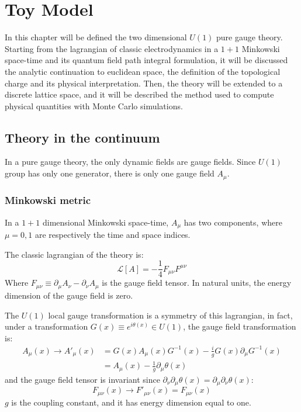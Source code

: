 \chapter{Toy Model}\label{ch:toy_model}

In this chapter will be defined the two dimensional $U(1)$ pure gauge theory.
Starting from the lagrangian of classic electrodynamics in a $1+1$ Minkowski space-time and its quantum field path integral formulation,
it will be discussed the analytic continuation to euclidean space, the definition of the topological charge and its physical interpretation.
Then, the theory will be extended to a discrete lattice space, and it will be described the method used to compute physical quantities with Monte Carlo simulations.

\section{Theory in the continuum}

In a pure gauge theory, the only dynamic fields are gauge fields.
Since $U(1)$ group has only one generator, there is only one gauge field $A_\mu$.

\subsection*{Minkowski metric}

In a $1+1$ dimensional Minkowski space-time, $A_\mu$ has two components, where $\mu = 0, 1$ are respectively the time and space indices.

The classic lagrangian of the theory is:
\[
    \mathcal L[A] = -\frac{1}{4} F_{\mu\nu}F^{\mu\nu}
\]
Where $F_{\mu\nu} \equiv \partial_\mu A_\nu - \partial_\nu A_\mu$ is the gauge field tensor.
In natural units, the energy dimension of the gauge field is zero.

The $U(1)$ local gauge transformation is a symmetry of this lagrangian, in fact,
under a transformation $G(x) \equiv e^{i\theta(x)} \in U(1)$,
the gauge field transformation is:
\begin{align*}
    A_\mu(x) \rightarrow A'_\mu(x) &= G(x) A_\mu(x) G^{-1}(x) - \frac{i}{g} G(x) \partial_\mu G^{-1}(x) \\
                                   &= A_\mu(x) - \frac{1}{g} \partial_\mu \theta(x)
\end{align*}
and the gauge field tensor is invariant since $\partial_\nu\partial_\mu\theta(x) = \partial_\mu\partial_\nu\theta(x)$:
\[
    F_{\mu\nu}(x) \rightarrow F'_{\mu\nu}(x) = F_{\mu\nu}(x)
\]
$g$ is the coupling constant, and it has energy dimension equal to one.

